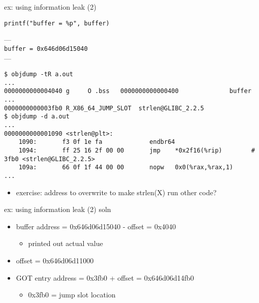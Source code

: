\begin{frame}[fragile]{ex: using information leak (2)}
\begin{Verbatim}[fontsize=\fontsize{9}{10}]
printf("buffer = %p", buffer)
\end{Verbatim}
--- \\
{\small \texttt{buffer = 0x646d06d15040}} \\
--- \\
\begin{Verbatim}[fontsize=\fontsize{9}{10}]
$ objdump -tR a.out
...
0000000000004040 g     O .bss   0000000000000400              buffer
...
0000000000003fb0 R_X86_64_JUMP_SLOT  strlen@GLIBC_2.2.5
$ objdump -d a.out
...
0000000000001090 <strlen@plt>:
    1090:       f3 0f 1e fa             endbr64
    1094:       ff 25 16 2f 00 00       jmp    *0x2f16(%rip)        # 3fb0 <strlen@GLIBC_2.2.5>
    109a:       66 0f 1f 44 00 00       nopw   0x0(%rax,%rax,1)
...
\end{Verbatim}
\begin{itemize}
\item exercise: address to overwrite to make strlen(X) run other code?
\end{itemize}
\end{frame}

\begin{frame}{ex: using information leak (2) soln}
\begin{itemize}
\item buffer address = 0x646d06d15040 - offset = 0x4040  
    \begin{itemize}
    \item printed out actual value
    \end{itemize}
\item offset = 0x646d06d11000
\item GOT entry address = 0x3fb0 + offset = 0x646d06d14fb0
    \begin{itemize}
    \item 0x3fb0 = jump slot location
    \end{itemize}
\end{itemize}
\end{frame}
